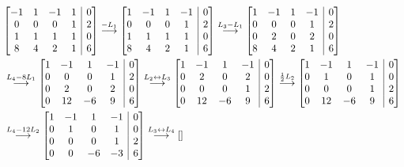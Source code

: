 \documentclass[12pt,a4paper]{article}
\makeatletter
\newenvironment{amatrix}[1]{%
  \left[\begin{array}{@{}*{#1}{c}|c@{}}
}{%
  \end{array}\right]
}
\newcommand{\grstep}[2][\relax]{%
   \ensuremath{\mathrel{
       {\mathop{\longrightarrow}\limits^{#2\mathstrut}_{
                                     \begin{subarray}{l} #1 \end{subarray}}}}}}
\newcommand{\swap}{\leftrightarrow}
\makeatother
\begin{document}
\begin{enumerate}
\begin{align*}
&
\begin{amatrix}{4}
-1 & 1 & -1 & 1 & 0 \\
 0 & 0 &  0 & 1 & 2 \\
 1 & 1 &  1 & 1 & 0 \\
 8 & 4 &  2 & 1 & 6
\end{amatrix}
\grstep{ -L_1 }
\begin{amatrix}{4}
 1 &-1 &  1 & -1 & 0 \\
 0 & 0 &  0 &  1 & 2 \\
 1 & 1 &  1 &  1 & 0 \\
 8 & 4 &  2 &  1 & 6
\end{amatrix}
\grstep{ L_3 - L_1 }
\begin{amatrix}{4}
 1 &-1 &  1 & -1 & 0 \\
 0 & 0 &  0 &  1 & 2 \\
 0 & 2 &  0 &  2 & 0 \\
 8 & 4 &  2 &  1 & 6
\end{amatrix}\\
&
\grstep{ L_4 - 8L_1 }
\begin{amatrix}{4}
 1 & -1 & 1 & -1 & 0 \\
 0 &  0 & 0 &  1 & 2 \\
 0 &  2 & 0 &  2 & 0 \\
 0 & 12 & -6 & 9 & 6
\end{amatrix}
\grstep{ L_2 \swap L_3 }
\begin{amatrix}{4}
 1 & -1 & 1 & -1 & 0 \\
 0 &  2 & 0 &  2 & 0 \\
 0 &  0 & 0 &  1 & 2 \\
 0 & 12 & -6 & 9 & 6
\end{amatrix}
\grstep{ \frac{1}{2}L_2 }
\begin{amatrix}{4}
 1 & -1 & 1 & -1 & 0 \\
 0 &  1 & 0 &  1 & 0 \\
 0 &  0 & 0 &  1 & 2 \\
 0 & 12 & -6 & 9 & 6
\end{amatrix}\\
&
\grstep{ L_4 - 12 L_2 }
\begin{amatrix}{4}
 1 & -1 & 1 & -1 & 0 \\
 0 &  1 & 0 &  1 & 0 \\
 0 &  0 & 0 &  1 & 2 \\
 0 &  0 & -6 & -3 & 6
\end{amatrix}
\grstep{ L_3 \swap L_4 }
\begin{amatrix}{4}

\end{amatrix}
\end{align*}
\end{enumerate}
\end{document}

